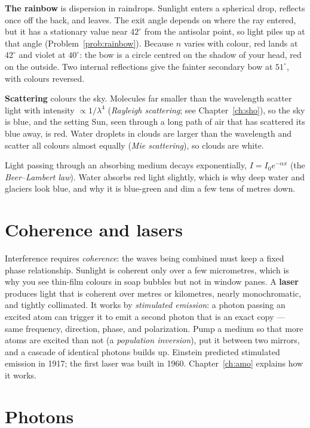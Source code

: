 \textbf{The rainbow} is dispersion in raindrops. Sunlight enters a spherical drop, reflects once off the back, and leaves. The exit angle depends on where the ray entered, but it has a stationary value near $42^\circ$ from the antisolar point, so light piles up at that angle (Problem~\ref{prob:rainbow}). Because $n$ varies with colour, red lands at $42^\circ$ and violet at $40^\circ$: the bow is a circle centred on the shadow of your head, red on the outside. Two internal reflections give the fainter secondary bow at $51^\circ$, with colours reversed.

\textbf{Scattering} colours the sky. Molecules far smaller than the wavelength scatter light with intensity $\propto 1/\lambda^4$ (\emph{Rayleigh scattering}; see Chapter~\ref{ch:sho}), so the sky is blue, and the setting Sun, seen through a long path of air that has scattered its blue away, is red. Water droplets in clouds are larger than the wavelength and scatter all colours almost equally (\emph{Mie scattering}), so clouds are white.

Light passing through an absorbing medium decays exponentially, $I = I_0 e^{-\alpha x}$ (the \emph{Beer--Lambert law}). Water absorbs red light slightly, which is why deep water and glaciers look blue, and why it is blue-green and dim a few tens of metres down.

\section{Coherence and lasers}

Interference requires \emph{coherence}: the waves being combined must keep a fixed phase relationship. Sunlight is coherent only over a few micrometres, which is why you see thin-film colours in soap bubbles but not in window panes. A \textbf{laser} produces light that is coherent over metres or kilometres, nearly monochromatic, and tightly collimated. It works by \emph{stimulated emission}: a photon passing an excited atom can trigger it to emit a second photon that is an exact copy --- same frequency, direction, phase, and polarization. Pump a medium so that more atoms are excited than not (a \emph{population inversion}), put it between two mirrors, and a cascade of identical photons builds up. Einstein predicted stimulated emission in 1917; the first laser was built in 1960. Chapter~\ref{ch:amo} explains how it works.

\section{Photons}
\label{sec:photons}

